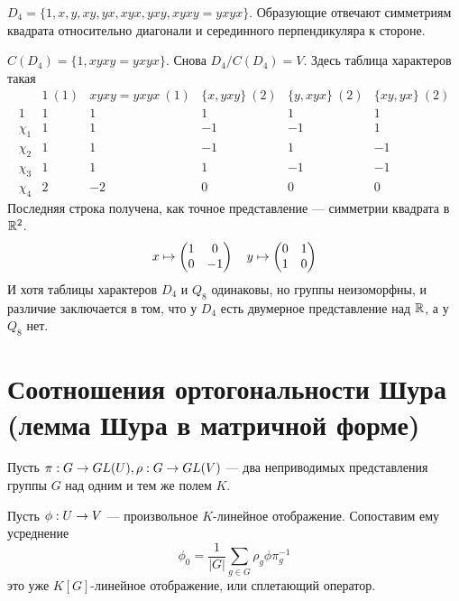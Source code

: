 {    $D_4 = \{1, x, y, xy, yx, xyx, yxy, xyxy = yxyx\}$.
    Образующие отвечают симметриям квадрата относительно диагонали и серединного перпендикуляра к стороне.

    $C(D_4) = \{1, xyxy = yxyx\}$. Снова $D_4/C(D_4) = V$. Здесь таблица характеров такая
    \[\begin{array}{c|ccccc}
          & 1 ~(1) & xyxy = yxyx ~(1) & \{x, yxy\} ~(2) & \{y, xyx\} ~(2) & \{xy, yx\} ~(2) \\\hline
          1      & 1      & 1                & 1               & 1               & 1               \\
          \chi_1 & 1      & 1                & -1              & -1              & 1               \\
          \chi_2 & 1      & 1                & -1              & 1               & -1              \\
          \chi_3 & 1      & 1                & 1               & -1              & -1              \\
          \chi_4 & 2      & -2               & 0               & 0               & 0
    \end{array}\]
    Последняя строка получена, как точное представление --- симметрии квадрата в $\mathbb{R}^2$.
    \[x \mapsto \begin{pmatrix}1 & 0 \\ 0 & -1\end{pmatrix} \quad y \mapsto \begin{pmatrix}0 & 1 \\ 1 & 0\end{pmatrix}\]
    И хотя таблицы характеров $D_4$ и $Q_8$ одинаковы, но группы неизоморфны, и различие заключается в том, что у $D_4$ есть двумерное представление над $\mathbb{R}$, а у $Q_8$ нет.
}


\section{Соотношения ортогональности Шура (лемма Шура в матричной форме)}
Пусть $\pi: G \rightarrow GL(U), \rho: G \rightarrow GL(V)$ --- два неприводимых представления группы $G$ над одним и тем же полем $K$.

Пусть $\phi: U \rightarrow V$ --- произвольное $K$-линейное отображение.
Сопоставим ему усреднение \[\phi_0 = \frac{1}{|G|}\sum\limits_{g \in G}\rho_g \phi \pi_g^{-1}\] это уже $K[G]$-линейное отображение, или сплетающий оператор.

